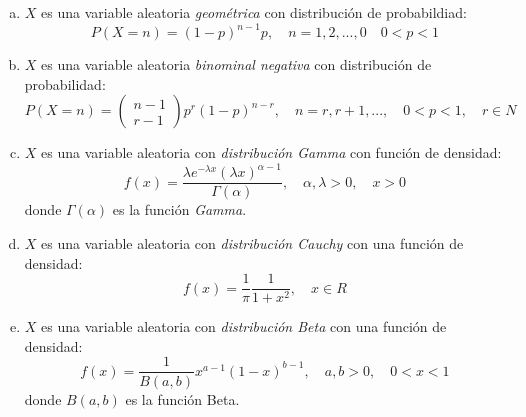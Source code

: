 \documentclass{article}
\begin{document}
\begin{enumerate}[a)]
    \item $X$ es una variable aleatoria \textit{geométrica} con distribución de probabildiad:
    \[ P (X = n) = (1-p)^{n-1}p, \quad n = 1,2,...,0 \quad 0<p<1 \]
    \item $X$ es una variable aleatoria \textit{binominal negativa} con distribución de probabilidad:
    \[ P (X = n) =  \left( \begin{matrix} n-1 \\ r-1 \end{matrix} \right)p^r(1-p)^{n-r}, \quad n=r,r+1,..., \quad 0<p<1, \quad r\in N\]
    \item $X$ es una variable aleatoria con \textit{distribución Gamma} con función de densidad:
    \[ f(x) = \frac{\lambda e^{-\lambda x}(\lambda x)^{\alpha-1}}{\Gamma(\alpha)}, \quad \alpha,\lambda > 0, \quad x>0 \]
    donde $\Gamma(\alpha)$ es la función \textit{Gamma}.
    \item $X$ es una variable aleatoria con \textit{distribución Cauchy} con una función de densidad:
    \[ f(x) = \frac{1}{\pi} \frac{1}{1+x^2}, \quad x \in R \]
    \item $X$ es una variable aleatoria con \textit{distribución Beta} con una función de densidad:
    \[ f(x) = \frac{1}{B(a,b)}x^{a-1}(1-x)^{b-1}, \quad a,b>0, \quad 0<x<1 \]
    donde $B(a,b)$ es la función Beta.
\end{enumerate}
\end{document}
